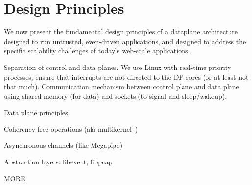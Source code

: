 \section{Design Principles}
\label{sec:design}

We now present the fundamental design principles of a dataplane
architecture designed to run untrusted, even-driven applications, and
designed to address the specific scalabilty challenges of today's
web-scale applications.




\todo Separation of control and data planes.  We use Linux with
real-time priority processes; ensure that interrupts are not directed
to the DP cores (or at least not that much).  Communication mechanism
between control plane and data plane using shared memory (for data)
and sockets (to signal and sleep/wakeup).

\todo Data plane principles

\todo Coherency-free operations  (ala multikernel~\cite{DBLP:conf/sosp/BaumannBDHIPRSS09})


\todo Asynchronous channels (like Megapipe)

\todo Abstraction layers: libevent, libpcap

\todo MORE


